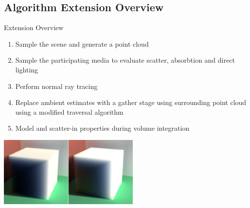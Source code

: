 \documentclass[10pt,compress,professionalfont]{beamer}
\begin{document}
\subsection{Algorithm Extension Overview}
\begin{frame}{Extension Overview}

    \begin{enumerate}
        \item Sample the scene and generate a point cloud
        \item \alert{ Sample the participating media to evaluate scatter, absorbtion and direct lighting}
        \item Perform normal ray tracing
        \item Replace ambient estimates with a gather stage using surrounding point cloud \alert{using a modified traversal algorithm}
        \item \alert{ Model and scatter-in properties during volume integration}
    \end{enumerate}
    \vspace{4mm}
    {\centering
        \includegraphics[width=70mm]{../img/inscat_comp2}\\
    }

\end{frame}
\end{document}
